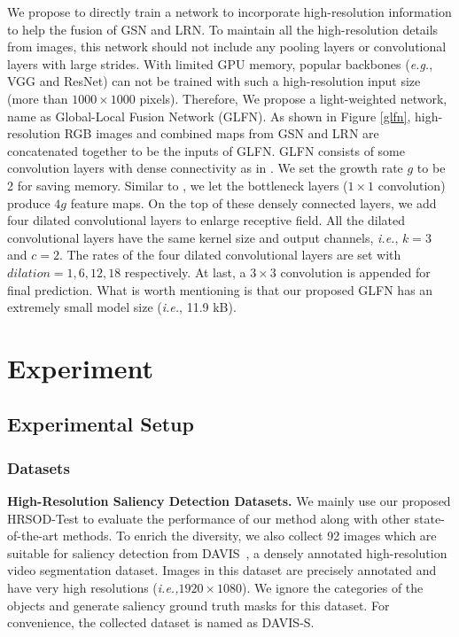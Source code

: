 \documentclass[10pt,twocolumn,letterpaper]{article}
\begin{document}
We propose to directly train a network to incorporate high-resolution information to help the fusion of GSN and LRN. To maintain all the high-resolution details from images, this network should not include any pooling layers or convolutional layers with large strides. With limited GPU memory, popular backbones (\emph{e.g.}, VGG and ResNet) can not be trained with such a high-resolution input size (more than $1000\times1000$ pixels). Therefore, We propose a light-weighted network, name as Global-Local Fusion Network (GLFN). As shown in Figure \ref{glfn}, high-resolution RGB images and combined maps from GSN and LRN are concatenated together to be the inputs of GLFN. GLFN consists of some convolution layers with dense connectivity as in \cite{huang2017densely}. We set the growth rate $g$ to be 2 for saving memory. Similar to \cite{huang2017densely}, we let the bottleneck layers ($1\times1$ convolution) produce $4g$ feature maps. On the top of these densely connected layers, we add four dilated convolutional layers to enlarge receptive field. All the dilated convolutional layers have the same kernel size and output channels, \emph{i.e.}, $k=3$ and $c=2$. The rates of the four dilated convolutional layers are set with $dilation=1, 6, 12, 18$ respectively. At last, a $3\times3$ convolution is appended for final prediction. What is worth mentioning is that our proposed GLFN has an extremely small model size (\emph{i.e.}, 11.9 kB). 

\section{Experiment}
\subsection{Experimental Setup}
\subsubsection{Datasets}\label{411}
\noindent\textbf{High-Resolution Saliency Detection Datasets.} We mainly use our proposed HRSOD-Test to evaluate the performance of our method along with other state-of-the-art methods. To enrich the diversity, we also collect 92 images which are suitable for saliency detection from DAVIS~\cite{perazzi2016benchmark}, a densely annotated high-resolution video segmentation dataset. Images in this dataset are precisely annotated and have very high resolutions (\emph{i.e.,}$1920\times1080$). We ignore the categories of the objects and generate saliency ground truth masks for this dataset. For convenience, the collected dataset is named as DAVIS-S.
\end{document}
